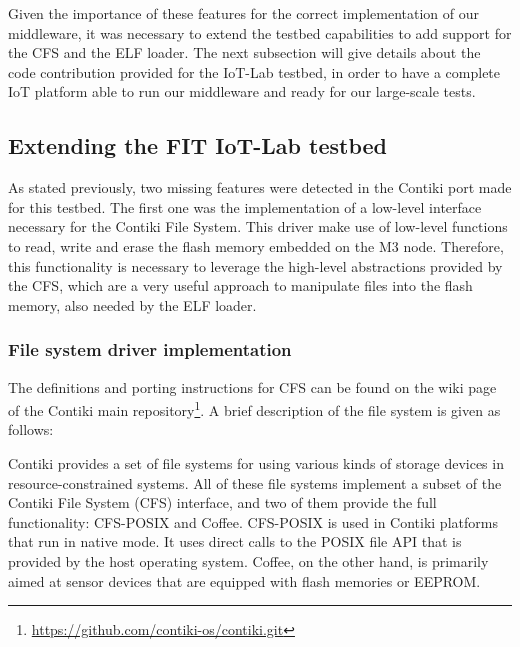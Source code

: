 Given the importance of these features for the correct implementation of our middleware, it was necessary to extend the testbed capabilities to add support for the CFS and the ELF loader.
The next subsection will give details about the code contribution provided for the IoT-Lab testbed, in order to have a complete IoT platform able to run our middleware and ready for our large-scale tests.

\subsection{Extending the FIT IoT-Lab testbed}
As stated previously, two missing features were detected in the Contiki port made for this testbed.
The first one was the implementation of a low-level interface necessary for the Contiki File System.
This driver make use of low-level functions to read, write and erase the flash memory embedded on the M3 node.
Therefore, this functionality is necessary to leverage the high-level abstractions provided by the CFS, which are a very useful approach to manipulate files into the flash memory, also needed by the ELF loader.

\subsubsection{File system driver implementation}
The definitions and porting instructions for CFS can be found on the wiki page of the Contiki main repository\footnote{\url{https://github.com/contiki-os/contiki.git}}.
A brief description of the file system is given as follows:

\begin{citeverbatim}
	Contiki provides a set of file systems for using various kinds of storage devices in resource-constrained systems. 
	All of these file systems implement a subset of the Contiki File System (CFS) interface, and two of them provide the full functionality: CFS-POSIX and Coffee.
	CFS-POSIX is used in Contiki platforms that run in native mode. 
	It uses direct calls to the POSIX file API that is provided by the host operating system. 
	Coffee, on the other hand, is primarily aimed at sensor devices that are equipped with flash memories or EEPROM.
\end{citeverbatim}

